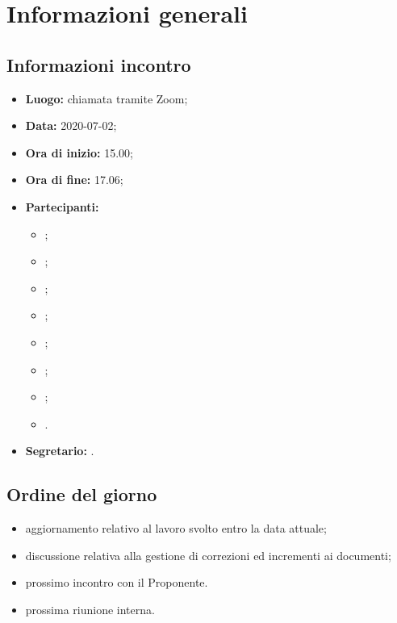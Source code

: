 \section{Informazioni generali}
\subsection{Informazioni incontro}
\begin{itemize}
	\item \textbf{Luogo:} chiamata tramite Zoom;
	\item \textbf{Data:} 2020-07-02;
	\item \textbf{Ora di inizio:} 15.00;
	\item \textbf{Ora di fine:} 17.06;
	\item \textbf{Partecipanti:}
		\begin{itemize}
			\item \VB;
			\item \LB;
			\item \NF;
			\item \EG;
			\item \FJ;
			\item \MP;
			\item \AS;
			\item \AZ.
		\end{itemize}
	\item \textbf{Segretario:} \AS.
\end{itemize}

\subsection{Ordine del giorno}
\begin{itemize}
	\item aggiornamento relativo al lavoro svolto entro la data attuale;
	\item discussione relativa alla gestione di correzioni ed incrementi ai documenti;
	\item prossimo incontro con il Proponente.
	\item prossima riunione interna.
\end{itemize}

